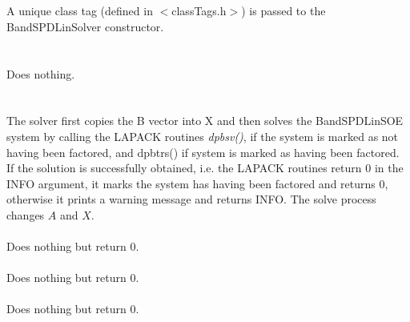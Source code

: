   \\
  \\
A unique class tag (defined in $<$classTags.h$>$) is passed to the
BandSPDLinSolver constructor. \\


 \\
\\ 
Does nothing. \\

  \\
 \\
The solver first copies the B vector into X and then solves the
BandSPDLinSOE system by calling the LAPACK routines {\em 
dpbsv()}, if the system is marked as not having been factored,
and dpbtrs() if system is marked as having been factored. 
If the solution is successfully obtained, i.e. the LAPACK routines
return $0$ in the INFO argument, it marks the system has having been 
factored and returns $0$, otherwise it prints a warning message and
returns INFO. The solve process changes $A$ and $X$. \\   


 \\
Does nothing but return $0$. \\

 \\ 
Does nothing but return $0$. \\

 \\ 
Does nothing but return $0$. \\



